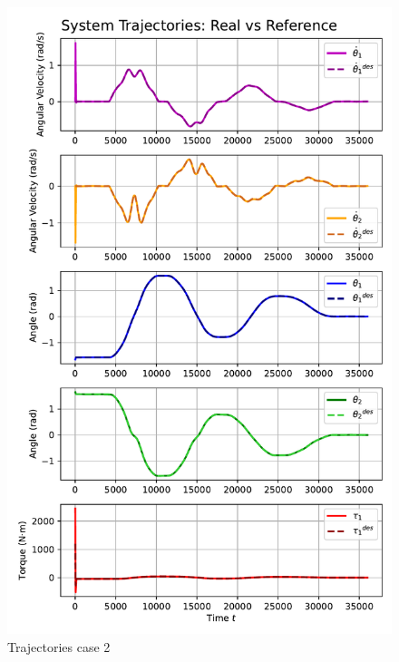 \begin{figure}[htb]
    \centering
    \includegraphics[width=1\linewidth]{img/3-task3/LQR2.pdf}
    \caption{Trajectories case 2}
    \label{fig:dtheta1-evolution}
\end{figure}

